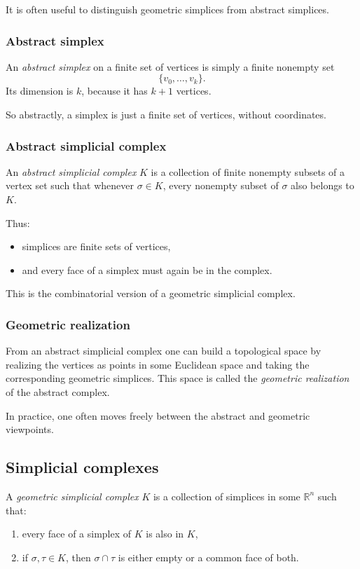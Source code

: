 \documentclass[12pt,a4paper]{article}
\theoremstyle{notespace}
\begin{document}
It is often useful to distinguish geometric simplices from abstract simplices.

\subsubsection{Abstract simplex}

An \emph{abstract simplex} on a finite set of vertices is simply a finite nonempty set
\[
\{v_0,\dots,v_k\}.
\]
Its dimension is \(k\), because it has \(k+1\) vertices.

So abstractly, a simplex is just a finite set of vertices, without coordinates.

\subsubsection{Abstract simplicial complex}

An \emph{abstract simplicial complex} \(K\) is a collection of finite nonempty subsets of a vertex set such that whenever \(\sigma\in K\), every nonempty subset of \(\sigma\) also belongs to \(K\).

Thus:
\begin{itemize}
	\item simplices are finite sets of vertices,
	\item and every face of a simplex must again be in the complex.
\end{itemize}

This is the combinatorial version of a geometric simplicial complex.

\subsubsection{Geometric realization}

From an abstract simplicial complex one can build a topological space by realizing the vertices as points in some Euclidean space and taking the corresponding geometric simplices. This space is called the \emph{geometric realization} of the abstract complex.

In practice, one often moves freely between the abstract and geometric viewpoints.

\subsection{Simplicial complexes}

A \emph{geometric simplicial complex} \(K\) is a collection of simplices in some \(\mathbb{R}^n\) such that:
\begin{enumerate}
	\item every face of a simplex of \(K\) is also in \(K\),
	\item if \(\sigma,\tau\in K\), then \(\sigma\cap\tau\) is either empty or a common face of both.
\end{enumerate}
\end{document}

